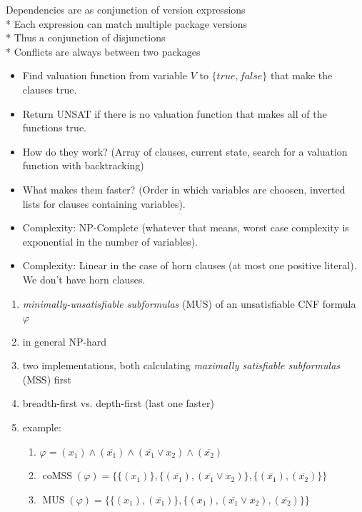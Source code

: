 \documentclass[a4paper,landscape]{foils}
\newcommand\slide[1]{\foilhead[-1cm]{#1}}
\begin{document}
\noindent * Dependencies are as conjunction of version expressions \\
 * Each expression can match multiple package versions \\
 * Thus a conjunction of disjunctions \\
 * Conflicts are always between two packages \\

\slide{SAT Solvers}

\begin{itemize}
\item Find valuation function from variable $V$ to $\{true,false\}$ that make the clauses true.
\item Return UNSAT if there is no valuation function that makes all of the functions true.
\item How do they work? (Array of clauses, current state, search for a valuation function with backtracking)
\item What makes them faster? (Order in which variables are choosen, inverted lists for clauses containing variables).
\item Complexity: NP-Complete (whatever that means, worst case complexity is exponential in the number of variables).
\item Complexity: Linear in the case of horn clauses (at most one positive literal). We don't have horn clauses.
\end{itemize}

\slide{Min-UNSAT}

\begin{enumerate}
\item \emph{minimally-unsatisfiable subformulas} (MUS) of an unsatisfiable CNF formula $\varphi$
\item in general NP-hard
\item two implementations, both calculating \emph{maximally satisfiable subformulas} (MSS) first
\item breadth-first vs. depth-first (last one faster)
\item example: 
\begin{enumerate}
  \item $\varphi = (x_1) \land (\overline{x_1}) \land (\overline{x_1} \lor x_2) \land (\overline{x_2})$
  \item $\operatorname{coMSS}(\varphi) = \bigl\{
      \{(x_1)\}, 
      \{(\overline{x_1}),(\overline{x_1} \lor x_2)\},
      \{(\overline{x_1}),(\overline{x_2})\} \bigr\}$
  \item $\operatorname{MUS}(\varphi) = \bigl\{
      \{(x_1),(\overline{x_1})\},
      \{(x_1),(\overline{x_1} \lor x_2), (\overline{x_2})\}\bigr\}$
\end{enumerate}
\end{enumerate}
\end{document}
